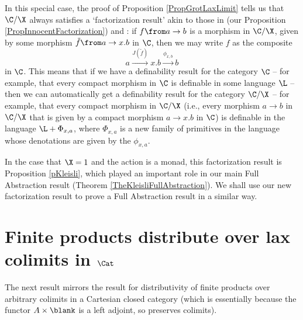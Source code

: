 In this special case, the proof of Proposition \ref{PropGrotLaxLimit} tells us that $\C/\X$ always satisfies a `factorization result' akin to those in \cite{SamsonGuyIAActive} (our Proposition \ref{PropInnocentFactorization}) and \cite{mcCHFiniteND}: if $f \from a \to b$ is a morphism in $\C/\X$, given by some morphism $\tilde{f}\from a \to x.b$ in $\C$, then we may write $f$ as the composite
\[
  a \xrightarrow{J(\tilde{f})} x.b \xrightarrow{\phi_{x,b}} b
  \]
in $\C$.  
This means that if we have a definability result for the category $\C$ -- for example, that every compact morphism in $\C$ is definable in some language $\L$ -- then we can automatically get a definability result for the category $\C/\X$ -- for example, that every compact morphism in $\C/\X$ (i.e., every morphism $a\to b$ in $\C/\X$ that is given by a compact morphism $a \to x.b$ in $\C$) is definable in the language $\L + \Phi_{x,a}$, where $\Phi_{x,a}$ is a new family of primitives in the language whose denotations are given by the $\phi_{x,a}$.

In the case that $\X=1$ and the action is a monad, this factorization result is Proposition \ref{pKleisli}, which played an important role in our main Full Abstraction result (Theorem \ref{TheKleisliFullAbstraction}).
We shall use our new factorization result to prove a Full Abstraction result in a similar way.

\section{Finite products distribute over lax colimits in $\Cat$}

The next result mirrors the result for distributivity of finite products over arbitrary colimits in a Cartesian closed category (which is essentially because the functor $A \times \blank$ is a left adjoint, so preserves colimits).

